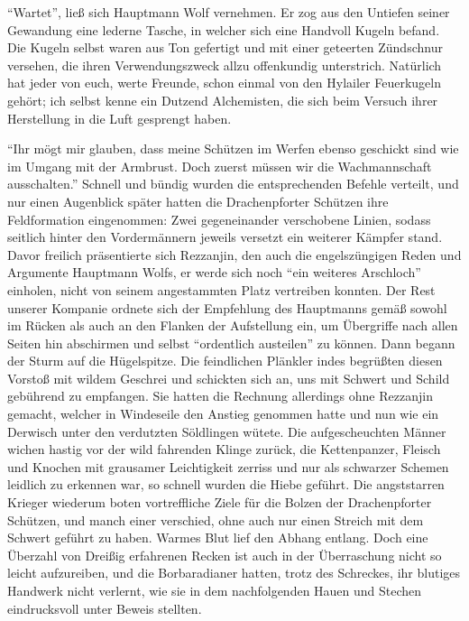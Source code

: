 ``Wartet'', ließ sich Hauptmann Wolf vernehmen. Er zog aus den Untiefen seiner Gewandung eine lederne Tasche, in welcher sich eine Handvoll Kugeln befand. Die Kugeln selbst waren aus Ton gefertigt und mit einer geteerten Zündschnur versehen, die ihren Verwendungszweck allzu offenkundig unterstrich. Natürlich hat jeder von euch, werte Freunde, schon einmal von den Hylailer Feuerkugeln gehört; ich selbst kenne ein Dutzend Alchemisten, die sich beim Versuch ihrer Herstellung in die Luft gesprengt haben.

``Ihr mögt mir glauben, dass meine Schützen im Werfen ebenso geschickt sind wie im Umgang mit der Armbrust. Doch zuerst müssen wir die Wachmannschaft ausschalten.'' Schnell und bündig wurden die entsprechenden Befehle verteilt, und nur einen Augenblick später hatten die Drachenpforter Schützen ihre Feldformation eingenommen: Zwei gegeneinander verschobene Linien, sodass seitlich hinter den Vordermännern jeweils versetzt ein weiterer Kämpfer stand. Davor freilich präsentierte sich Rezzanjin, den auch die engelszüngigen Reden und Argumente Hauptmann Wolfs, er werde sich noch ``ein weiteres Arschloch'' einholen, nicht von seinem angestammten Platz vertreiben konnten. Der Rest unserer Kompanie ordnete sich der Empfehlung des Hauptmanns gemäß sowohl im Rücken als auch an den Flanken der Aufstellung ein, um Übergriffe nach allen Seiten hin abschirmen und selbst ``ordentlich austeilen'' zu können. Dann begann der Sturm auf die Hügelspitze. Die feindlichen Plänkler indes begrüßten diesen Vorstoß mit wildem Geschrei und schickten sich an, uns mit Schwert und Schild gebührend zu empfangen. Sie hatten die Rechnung allerdings ohne Rezzanjin gemacht, welcher in Windeseile den Anstieg genommen hatte und nun wie ein Derwisch unter den verdutzten Söldlingen wütete. Die aufgescheuchten Männer wichen hastig vor der wild fahrenden Klinge zurück, die Kettenpanzer, Fleisch und Knochen mit grausamer Leichtigkeit zerriss und nur als schwarzer Schemen leidlich zu erkennen war, so schnell wurden die Hiebe geführt. Die angststarren Krieger wiederum boten vortreffliche Ziele für die Bolzen der Drachenpforter Schützen, und manch einer verschied, ohne auch nur einen Streich mit dem Schwert geführt zu haben. Warmes Blut lief den Abhang entlang. Doch eine Überzahl von Dreißig erfahrenen Recken ist auch in der Überraschung nicht so leicht aufzureiben, und die Borbaradianer hatten, trotz des Schreckes, ihr blutiges Handwerk nicht verlernt, wie sie in dem nachfolgenden Hauen und Stechen eindrucksvoll unter Beweis stellten. 


